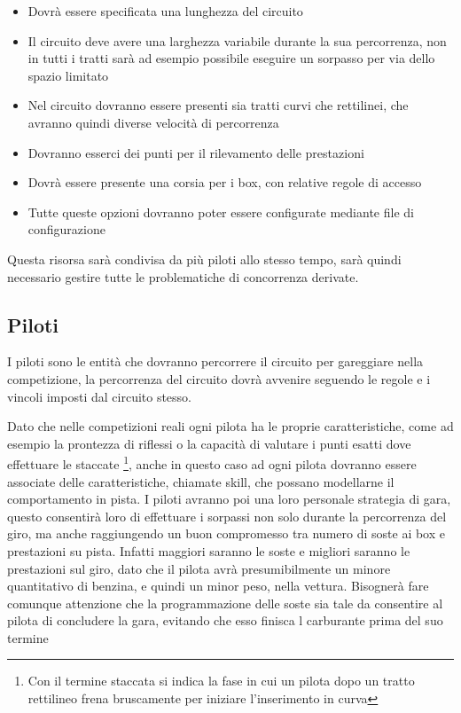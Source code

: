 \documentclass[a4paper,11pt, twoside]{book}
\begin{document}
	\begin{itemize}
	  \item Dovrà essere specificata una lunghezza del circuito
	  \item Il circuito deve avere una larghezza variabile durante la sua percorrenza, non in tutti i tratti sarà
		ad esempio possibile eseguire un sorpasso per via dello spazio limitato
	  \item Nel circuito dovranno essere presenti sia tratti curvi che rettilinei, che avranno quindi diverse velocità
		di percorrenza
	  \item Dovranno esserci dei punti per il rilevamento delle prestazioni
	  \item Dovrà essere presente una corsia per i box, con relative regole di accesso
	  \item Tutte queste opzioni dovranno poter essere configurate mediante file di configurazione
	\end{itemize}
	
	Questa risorsa sarà condivisa da più piloti allo stesso tempo, sarà quindi necessario gestire
	tutte le problematiche di concorrenza derivate.
	
	
	
	
      
      \subsection{Piloti}
	I piloti sono le entità che dovranno percorrere il circuito per gareggiare nella competizione,
	la percorrenza del circuito dovrà avvenire seguendo le regole e i vincoli imposti dal circuito
	stesso.
	
	Dato che nelle competizioni reali ogni pilota ha le proprie caratteristiche, come ad esempio la prontezza di riflessi
	o la capacità di valutare i punti esatti dove effettuare le staccate \footnote{Con il termine staccata si indica 
	la fase in cui un pilota dopo un tratto rettilineo frena bruscamente per iniziare l'inserimento in curva},
	anche in questo caso ad ogni pilota dovranno essere associate delle caratteristiche, chiamate skill, che possano
	modellarne il comportamento in pista.
	I piloti avranno poi una loro personale strategia di gara, questo consentirà loro di effettuare
	i sorpassi non solo durante la percorrenza del giro, ma anche raggiungendo un buon compromesso
	tra numero di soste ai box e prestazioni su pista. Infatti maggiori saranno le soste e migliori saranno le prestazioni
	sul giro, dato che il pilota avrà presumibilmente un minore quantitativo di benzina, e quindi un minor peso, nella vettura.
	Bisognerà fare comunque attenzione che la programmazione delle soste sia tale da consentire al pilota di concludere la gara,
	evitando che esso finisca l carburante prima del suo termine
	
\end{document}

